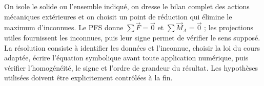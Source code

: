 \begin{corrigebox}[Corrigé]
On isole le solide ou l'ensemble indiqué, on dresse le bilan complet des actions mécaniques extérieures et on choisit un point de réduction qui élimine le maximum d'inconnues. Le PFS donne $\sum\vec F=\vec0$ et $\sum\vec M_A=\vec0$ ; les projections utiles fournissent les inconnues, puis leur signe permet de vérifier le sens supposé.
La résolution consiste à identifier les données et l'inconnue, choisir la loi du cours adaptée, écrire l'équation symbolique avant toute application numérique, puis vérifier l'homogénéité, le signe et l'ordre de grandeur du résultat. Les hypothèses utilisées doivent être explicitement contrôlées à la fin.
%
%
%
\end{corrigebox}
